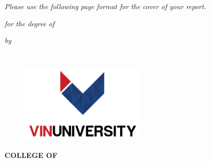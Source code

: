 \thispagestyle{empty}
\begin{center}
\vspace*{\fill}
{\textit{Please use the following page format for the cover of your report.}}
\vspace*{\fill} 
\end{center}
\newpage
\thispagestyle{empty}
\begin{center}
    { \huge {\bfseries {\ReportTitle}} \par}
\vspace{4\baselineskip}
    {\textit{\RoportType for the degree of} \par}
\vspace{4\baselineskip}
    {\large \bf \Degree \par} 
\vspace{\baselineskip}
    {\textit{by} \par}
\vspace{\baselineskip}
    {{\large {\bf \firstAuthor \\ \firstAuthorID}} \par}
\vspace{4\baselineskip}
    {\begin{figure}[!h] 
	\centering
	\includegraphics[width=60mm]{./Images/cecs_logo} 
     \end{figure}
    }
\vspace{1.5\baselineskip}
    {\bf \MakeUppercase{College of \College} \par}
\vspace*{1ex}
    {\bf \MakeUppercase{\University} \par}
\vspace*{5ex}
    {\bf \MakeUppercase{\reportSubmissionTerm} \par}    
    
 \end{center}
 
 